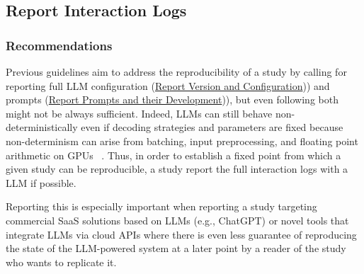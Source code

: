 



\subsection{Report Interaction Logs}

\subsubsection{Recommendations}




Previous guidelines aim to address the reproducibility of a study by calling for reporting full LLM configuration (\href{/guidelines/#report-veersion-and-configuration}{Report Version and Configuration})) and prompts (\href{/guidelines/#report-prompts}{Report Prompts and their Development})), but even following both might not be always sufficient. Indeed, LLMs can still behave non-deterministically even if decoding strategies and parameters are fixed because non-determinism can arise from batching, input preprocessing, and floating point arithmetic on GPUs ~\cite{Chann2023}. Thus, in order to establish a fixed point from which a given study can be reproducible, a study \should report the full interaction logs with a LLM if possible. 


Reporting this is especially important when reporting a study targeting commercial SaaS solutions based on LLMs (e.g., ChatGPT) or novel tools that integrate LLMs via cloud APIs where there is even less guarantee of reproducing the state of the LLM-powered system at a later point by a reader of the study who wants to replicate it. 




